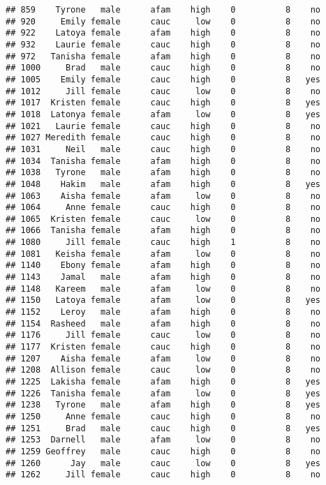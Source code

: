 \documentclass[
]{article}
\begin{document}
\begin{verbatim}
## 859    Tyrone   male      afam    high    0          8    no
## 920     Emily female      cauc     low    0          8    no
## 922    Latoya female      afam    high    0          8    no
## 932    Laurie female      cauc    high    0          8    no
## 972   Tanisha female      afam    high    0          8    no
## 1000     Brad   male      cauc    high    0          8    no
## 1005    Emily female      cauc    high    0          8   yes
## 1012     Jill female      cauc     low    0          8    no
## 1017  Kristen female      cauc    high    0          8   yes
## 1018  Latonya female      afam     low    0          8   yes
## 1021   Laurie female      cauc    high    0          8    no
## 1027 Meredith female      cauc    high    0          8    no
## 1031     Neil   male      cauc    high    0          8    no
## 1034  Tanisha female      afam    high    0          8    no
## 1038   Tyrone   male      afam    high    0          8    no
## 1048    Hakim   male      afam    high    0          8   yes
## 1063    Aisha female      afam     low    0          8    no
## 1064     Anne female      cauc    high    0          8    no
## 1065  Kristen female      cauc     low    0          8    no
## 1066  Tanisha female      afam    high    0          8    no
## 1080     Jill female      cauc    high    1          8    no
## 1081   Keisha female      afam     low    0          8    no
## 1140    Ebony female      afam    high    0          8    no
## 1143    Jamal   male      afam    high    0          8    no
## 1148   Kareem   male      afam     low    0          8    no
## 1150   Latoya female      afam     low    0          8   yes
## 1152    Leroy   male      afam    high    0          8    no
## 1154  Rasheed   male      afam    high    0          8    no
## 1176     Jill female      cauc     low    0          8    no
## 1177  Kristen female      cauc    high    0          8    no
## 1207    Aisha female      afam     low    0          8    no
## 1208  Allison female      cauc     low    0          8    no
## 1225  Lakisha female      afam    high    0          8   yes
## 1226  Tanisha female      afam     low    0          8   yes
## 1238   Tyrone   male      afam    high    0          8   yes
## 1250     Anne female      cauc    high    0          8    no
## 1251     Brad   male      cauc    high    0          8   yes
## 1253  Darnell   male      afam     low    0          8    no
## 1259 Geoffrey   male      cauc    high    0          8    no
## 1260      Jay   male      cauc     low    0          8   yes
## 1262     Jill female      cauc    high    0          8    no

\end{verbatim}
\end{document}
